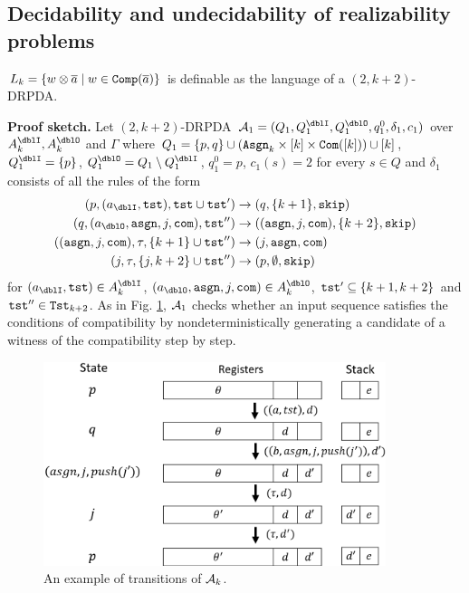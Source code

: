 \subsection{Decidability and undecidability of realizability problems}
\begin{lemma}\label{lem: Lk}
$L_k = \{w\otimes{\overline{a}} \mid w\in{\mathtt{Comp}}({\overline{a}})\}$ is definable as the language of a $(2,k+2)$-DRPDA.
\end{lemma}
{\bf Proof sketch.}\quad
Let $(2,k+2)$-DRPDA
$\calA_1=(Q_1, Q^\dblI_1, Q^\dblO_1, q^0_1, \delta_1, c_1)$
over $A_k^\dblI, A_k^\dblO$ and $\Gamma$ where
$Q_1=\{p, q\}\cup(\mathtt{Asgn}_k\times[k]\times\mathtt{Com}([k]))\cup[k]$, $Q^\dblI_1=\{p\}$, $Q^\dblO_1 = Q_1\setminus Q^\dblI_1$, $q^0_1 = p$,
$c_1(s)=2$ for every $s\in Q$ and $\delta_1$ consists of all the rules of the form
\begin{align}
(p, (a_\dblI, \tst), \tst\cup\tst')&\to(q, \{k+1\}, \skip)\label{eq: Lk1}\\
(q, (a_\dblO, \asgn, j, \com), \tst'')&\to((\asgn,j,\com), \{k+2\},\skip)\label{eq: Lk2}\\
((\asgn,j,\com), \tau, \{k+1\}\cup\tst'')&\to(j, \asgn, \com)\label{eq: Lk3}\\
(j, \tau, \{j, k+2\}\cup\tst'')&\to(p, \emptyset, \skip)\label{eq: Lk4}
\end{align}
for $(a_\dblI, \tst)\in A_k^\dblI$, $(a_\dblO, \asgn, j, \com)\in A_k^\dblO$, $\mathtt{tst}'\subseteq \{k+1,k+2\}$ and $\mathtt{tst}''\in\mathtt{Tst}_{k+2}$.
As in Fig. \ref{fig: lem_Lk},
${\cal A}_1$ checks whether an input sequence satisfies the conditions of compatibility
by nondeterministically generating a candidate of a witness of the compatibility step by step.
\begin{figure}[t]
  \centering
  \includegraphics[width=10cm]{lem_Lk.png}
  \caption{An example of transitions of ${\cal A}_k$.}
  \label{fig: lem_Lk}
\end{figure}

